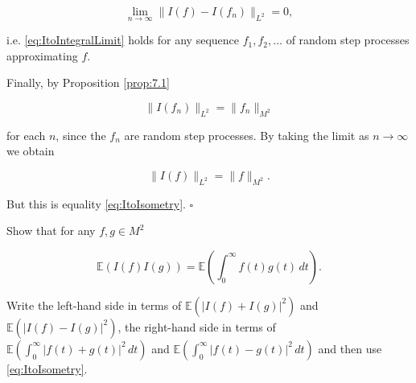 \begin{Proof}
\begin{equation}
\lim_{n \to \infty} \|I(f) - I(f_n)\|_{L^2} = 0,
\end{equation}

i.e. \eqref{eq:ItoIntegralLimit} holds for any sequence $f_1, f_2, \ldots$ of random step processes approximating $f$.

Finally, by Proposition \ref{prop:7.1}

\begin{equation}
\|I(f_n)\|_{L^2} = \|f_n\|_{M^2}
\end{equation}

for each $n$, since the $f_n$ are random step processes. By taking the limit as $n \to \infty$ we obtain

\begin{equation}
\|I(f)\|_{L^2} = \|f\|_{M^2}.
\end{equation}

But this is equality \eqref{eq:ItoIsometry}. \hfill $\square$
\end{Proof}

\begin{Exercise}
\label{ex:7.4}
Show that for any $f, g \in M^2$

\begin{equation}
\mathbb{E}(I(f) I(g)) = \mathbb{E}\left(\int_0^\infty f(t) g(t) \, dt\right).
\end{equation}

\begin{hint}
Write the left-hand side in terms of $\mathbb{E}\left(|I(f) + I(g)|^2\right)$ and $\mathbb{E}\left(|I(f) - I(g)|^2\right)$, the right-hand side in terms of $\mathbb{E}\left(\int_0^\infty |f(t) + g(t)|^2 \, dt\right)$ and $\mathbb{E}\left(\int_0^\infty |f(t) - g(t)|^2 \, dt\right)$ and then use \eqref{eq:ItoIsometry}.
\end{hint}
\end{Exercise}

